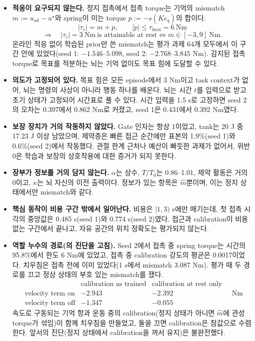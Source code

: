 \documentclass[11pt]{article}\usepackage[margin=1in]{geometry}\usepackage{amsmath,amssymb,amsthm,mathtools}\usepackage{graphicx}\graphicspath{{figures/}{../figures/}{figs/}{./}}\usepackage{enumitem}\usepackage{hyperref}\usepackage{cleveref}\usepackage{tikz}\usetikzlibrary{arrows.meta,positioning,calc,shapes.geometric}\usepackage{float}\usepackage{rotating}\usepackage[most]{tcolorbox}\usepackage{kotex}\usepackage{booktabs}\usepackage{longtable}\emergencystretch=1.6em\tolerance=2000 \crefname{assumption}{Assumption}{Assumptions}\Crefname{assumption}{Assumption}{Assumptions}\crefname{definition}{Definition}{Definitions}\Crefname{definition}{Definition}{Definitions}\crefname{proposition}{Proposition}{Propositions}\Crefname{proposition}{Proposition}{Propositions}\crefname{fact}{Fact}{Facts}\Crefname{fact}{Fact}{Facts} \newtheorem{assumption}{Assumption}\newtheorem{definition}{Definition}\newtheorem{lemma}{Lemma}\newtheorem{proposition}{Proposition}\newtheorem{theorem}{Theorem}\newtheorem{corollary}{Corollary}\newtheorem{fact}{Fact}\theoremstyle{remark}\newtheorem{remark}{Remark} \newcommand{\R}{\mathbb{R}}\newcommand{\xb}{\bar x}\newcommand{\Ab}{\bar A}\newcommand{\By}{\bar B_y}\newcommand{\U}{\mathcal U}\newcommand{\Z}{\mathcal Z}
\begin{document}
\begin{itemize}
\item \textbf{적응이 요구되지 않는다.} 정지 접촉에서 접촉 torque는 기억의 mismatch $m:=u_{\mathrm{ad}}-u^\star$와 spring이 미는 torque $p:=-s(Ke_q)$의 합이다.
\[
|\tau_c|=m+p,\qquad |p|\le\tau_{\max}=6\ \mathrm{Nm}
\]
\[
\Longrightarrow\quad |\tau_c|=3\ \mathrm{Nm}\ \text{is attainable at rest}\iff m\in[-3,9]\ \mathrm{Nm}.
\]
온라인 적응 없이 학습된 prior만 쓴 mismatch는 평가 과제 64개 모두에서 이 구간 안에 있었다(seed 1: $-1.546$--$5.098$, seed 2: $-2.768$--$3.845$ Nm). 감지된 접촉 torque로 목표를 적분하는 뇌는 기억 없이도 목표 힘에 도달할 수 있다.
\item \textbf{의도가 고정되어 있다.} 목표 힘은 모든 episode에서 3 Nm이고 task context가 없어, 뇌는 명령의 사상이 아니라 행동 하나를 배운다. 뇌는 시간 $t$를 입력으로 받고 초기 상태가 고정되어 시간표로 풀 수 있다. 시간 입력을 1.5 s로 고정하면 seed 2의 오차는 0.397에서 0.862 Nm로 커졌고, seed 1은 0.431에서 0.392 Nm였다.
\item \textbf{보장 장치가 거의 작동하지 않았다.} Gate 인자는 항상 1이었고, tank는 20 J 중 17.23 J 이상 남았으며, 제약층은 빠른 접근 순간에만 표본의 1.9\%(seed 1)와 0.6\%(seed 2)에서 작동했다. 관절 한계 근처나 예산이 빠듯한 과제가 없어서, 위반 0은 학습과 보장의 상호작용에 대한 증거가 되지 못한다.
\item \textbf{장부가 정보를 거의 담지 않는다.} $\alpha$는 상수, $T/T_0$는 0.86--1.01, 제약 활동은 거의 0이고, $\kappa$는 뇌 자신의 이전 출력이다. 정보가 있는 항목은 $\hat m$뿐이며, 이는 정지 상태에서만 mismatch와 같다.
\item \textbf{핵심 동작이 비용 구간 밖에서 일어난다.} 비용은 $[1,3)$ s에만 매기는데, 첫 접촉 시각의 중앙값은 0.485 s(seed 1)와 0.774 s(seed 2)였다. 접근과 calibration이 비용 없는 구간에서 끝나고, 자유 공간의 위치 정확도는 평가되지 않는다.
\item \textbf{역할 누수의 경로(의 진단을 고침).} Seed 2에서 접촉 중 spring torque는 시간의 95.8\%에서 한도 6 Nm에 있었고, 접촉 중 calibration 강도의 평균은 0.0017이었다. 치우침은 접촉 전에 이미 있었다(1 s에서 mismatch 3.087 Nm). 평가 때 두 경로를 끄고 정상 상태의 부호 있는 mismatch를 쟀다.
\[
\begin{array}{lcc}
 & \text{calibration as trained} & \text{calibration at rest only}\\
\text{velocity term on} & -2.943 & -2.392\\
\text{velocity term off} & -1.347 & -0.055
\end{array}\quad\mathrm{Nm}
\]
속도로 구동되는 기억 항과 운동 중의 calibration(정지 상태가 아니면 $\hat m$에 관성 torque가 섞임)이 함께 치우침을 만들었고, 둘을 끄면 calibration은 참값으로 수렴한다. 앞서의 진단(정지 상태에서 calibration을 꺼서 유지)은 불완전했다.

\end{itemize}
\end{document}
